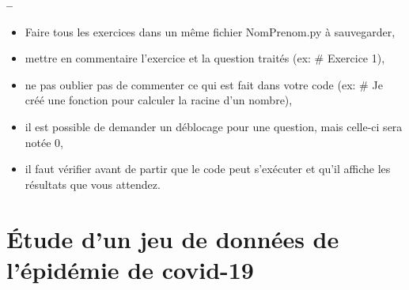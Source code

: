 


\usepackage{enumitem}







\begin{center}
{\Large\bf {\type} \no {\numero} -- \descrip}
\end{center}


\begin{boxedminipage}{.9\textwidth} 
\begin{itemize}
 \item Faire tous les exercices dans un même fichier {NomPrenom.py} à sauvegarder,
 \item mettre en commentaire l'exercice et la question traités (ex: \# Exercice 1),
 \item ne pas oublier pas de commenter ce qui est fait dans votre code (ex: \# Je créé une fonction pour calculer la racine d'un nombre),
 \item il est possible de demander un déblocage pour une question, mais celle-ci sera notée 0,
 \item il faut vérifier avant de partir que le code peut s'exécuter et qu'il affiche les résultats que vous attendez.
\end{itemize}
\end{boxedminipage}

\section*{Étude d'un jeu de données de l'épidémie de covid-19}

